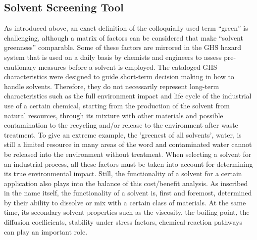 \documentclass[
  english,        %
  font=times,     %
  onecolumn,      %
]{article}
\begin{document}
\subsection*{Solvent Screening Tool}\label{sec:screening}
As introduced above, an exact definition of the colloquially used term “green” is challenging, although a matrix of factors can be considered that make “solvent greenness” comparable\cite{diorazioMoreHolisticFramework2016}. Some of these factors are mirrored in the GHS hazard system that is used on a daily basis by chemists and engineers to assess pre-cautionary measures before a solvent is employed\cite{moritaExpertReviewGHS2011}. The cataloged GHS characteristics were designed to guide short-term decision making in how to handle solvents. Therefore, they do not necessarily represent long-term characteristics such as the full environment impact and life cycle of the industrial use of a certain chemical, starting from the production of the solvent from natural resources, through its mixture with other materials and possible contamination to the recycling and/or release to the environment after waste treatment\cite{clarkeGreenSustainableSolvents2018,capelloWhatGreenSolvent2007,FrameworkSolventRecovery2019}. To give an extreme example, the 'greenest of all solvents', water, is still a limited resource in many areas of the word and contaminated water cannot be released into the environment without treatment\cite{richardsonWaterAnalysisEmerging2011}. When selecting a solvent for an industrial process, all these factors must be taken into account for determining its true environmental impact. Still, the functionality of a solvent for a certain application also plays into the balance of this cost/benefit analysis. As inscribed in the name itself, the functionality of a solvent is, first and foremost, determined by their ability to dissolve or mix with a certain class of materials\cite{wintertonGreenSolventCritical2021}. At the same time, its secondary solvent properties such as the viscosity, the boiling point, the diffusion coefficients, stability under stress factors, chemical reaction pathways can play an important role\cite{enekvistComputeraidedDesignSolvent2022,pilonDevelopmentSolventSustainability2024}.
\end{document}
